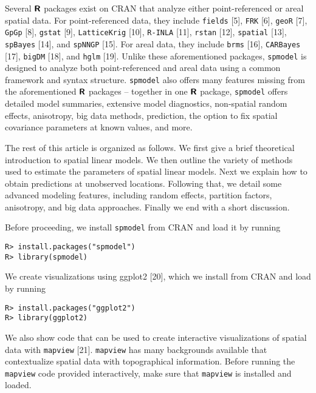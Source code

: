 \documentclass[10pt,letterpaper]{article}
\begin{document}
Several \(\textbf{\textsf{R}}\) packages exist on CRAN that analyze
either point-referenced or areal spatial data. For point-referenced
data, they include \texttt{fields} {[}5{]}, \texttt{FRK} {[}6{]},
\texttt{geoR} {[}7{]}, \texttt{GpGp} {[}8{]}, \texttt{gstat} {[}9{]},
\texttt{LatticeKrig} {[}10{]}, \texttt{R-INLA} {[}11{]}, \texttt{rstan}
{[}12{]}, \texttt{spatial} {[}13{]}, \texttt{spBayes} {[}14{]}, and
\texttt{spNNGP} {[}15{]}. For areal data, they include \texttt{brms}
{[}16{]}, \texttt{CARBayes} {[}17{]}, \texttt{bigDM} {[}18{]}, and
\texttt{hglm} {[}19{]}. Unlike these aforementioned packages,
\texttt{spmodel} is designed to analyze both point-referenced and areal
data using a common framework and syntax structure. \texttt{spmodel}
also offers many features missing from the aforementioned
\(\textbf{\textsf{R}}\) packages -- together in one
\(\textbf{\textsf{R}}\) package, \texttt{spmodel} offers detailed model
summaries, extensive model diagnostics, non-spatial random effects,
anisotropy, big data methods, prediction, the option to fix spatial
covariance parameters at known values, and more.

The rest of this article is organized as follows. We first give a brief
theoretical introduction to spatial linear models. We then outline the
variety of methods used to estimate the parameters of spatial linear
models. Next we explain how to obtain predictions at unobserved
locations. Following that, we detail some advanced modeling features,
including random effects, partition factors, anisotropy, and big data
approaches. Finally we end with a short discussion.

Before proceeding, we install \texttt{spmodel} from CRAN and load it by
running

\begin{verbatim}
R> install.packages("spmodel")
R> library(spmodel)
\end{verbatim}

We create visualizations using ggplot2 {[}20{]}, which we install from
CRAN and load by running

\begin{verbatim}
R> install.packages("ggplot2")
R> library(ggplot2)
\end{verbatim}

We also show code that can be used to create interactive visualizations
of spatial data with \texttt{mapview} {[}21{]}. \texttt{mapview} has
many backgrounds available that contextualize spatial data with
topographical information. Before running the \texttt{mapview} code
provided interactively, make sure that \texttt{mapview} is installed and
loaded.
\end{document}
